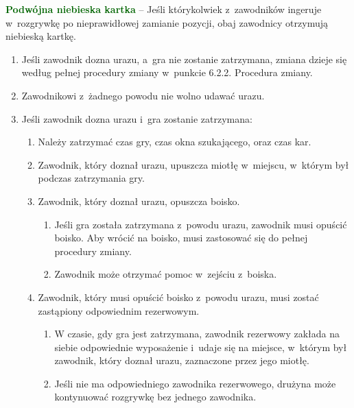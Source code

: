 \documentclass[12pt,a4paper]{article}
\renewcommand{\subsubsection}[1]{
  \oldsubsubsection{#1}%
  \leftskip1.3cm
}
\newcommand\other[1]{\bgroup\textcolor{darkgreen}{\textbf{#1}}}
\begin{document}
\other{Podwójna niebieska kartka} -- Jeśli którykolwiek z~zawodników
ingeruje w~rozgrywkę po nieprawidłowej zamianie pozycji, obaj zawodnicy
otrzymują niebieską kartkę.

\subsubsection{Zmiany z~powodu urazu}

\begin{enumerate}
	\item
	      Jeśli zawodnik dozna urazu, a~gra nie zostanie zatrzymana, zmiana
	      dzieje się według pełnej procedury zmiany w~punkcie 6.2.2. Procedura
	      zmiany.
	\item
	      Zawodnikowi z~żadnego powodu nie wolno udawać urazu.
	\item
	      Jeśli zawodnik dozna urazu i~gra zostanie zatrzymana:

	      \begin{enumerate}
		      \item
		            Należy zatrzymać czas gry, czas okna szukającego, oraz czas kar.
		      \item
		            Zawodnik, który doznał urazu, upuszcza miotłę w~miejscu, w~którym
		            był podczas zatrzymania gry.
		      \item
		            Zawodnik, który doznał urazu, opuszcza boisko.

		            \begin{enumerate}
			            \item
			                  Jeśli gra została zatrzymana z~powodu urazu, zawodnik musi opuścić
			                  boisko. Aby wrócić na boisko, musi zastosować się do pełnej
			                  procedury zmiany.
			            \item
			                  Zawodnik może otrzymać pomoc w~zejściu z~boiska.
		            \end{enumerate}
		      \item
		            Zawodnik, który musi opuścić boisko z~powodu urazu, musi zostać
		            zastąpiony odpowiednim rezerwowym.

		            \begin{enumerate}
			            \item
			                  W czasie, gdy gra jest zatrzymana, zawodnik rezerwowy zakłada na
			                  siebie odpowiednie wyposażenie i~udaje się na miejsce, w~którym
			                  był zawodnik, który doznał urazu, zaznaczone przez jego miotłę.
			            \item
			                  Jeśli nie ma odpowiedniego zawodnika rezerwowego, drużyna może
			                  kontynuować rozgrywkę bez jednego zawodnika.
		            \end{enumerate}
	      \end{enumerate}
\end{enumerate}
\end{document}
